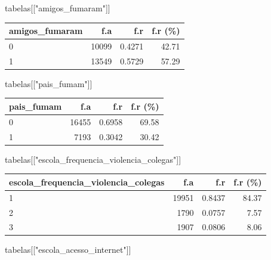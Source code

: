 \documentclass[
]{article}
\newenvironment{Shaded}{\begin{snugshade}}{\end{snugshade}}
\newcommand{\NormalTok}[1]{\textcolor[rgb]{0.00,0.23,0.31}{#1}}
\newcommand{\StringTok}[1]{\textcolor[rgb]{0.13,0.47,0.30}{#1}}
\begin{document}
\begin{Shaded}
\begin{Highlighting}[]
\NormalTok{tabelas[[}\StringTok{"amigos\_fumaram"}\NormalTok{]]}
\end{Highlighting}
\end{Shaded}

\begin{longtable}[]{@{}lrrr@{}}
\toprule()
amigos\_fumaram & f.a & f.r & f.r (\%) \\
\midrule()
\endhead
0 & 10099 & 0.4271 & 42.71 \\
1 & 13549 & 0.5729 & 57.29 \\
\bottomrule()
\end{longtable}

\begin{Shaded}
\begin{Highlighting}[]
\NormalTok{tabelas[[}\StringTok{"pais\_fumam"}\NormalTok{]]}
\end{Highlighting}
\end{Shaded}

\begin{longtable}[]{@{}lrrr@{}}
\toprule()
pais\_fumam & f.a & f.r & f.r (\%) \\
\midrule()
\endhead
0 & 16455 & 0.6958 & 69.58 \\
1 & 7193 & 0.3042 & 30.42 \\
\bottomrule()
\end{longtable}

\begin{Shaded}
\begin{Highlighting}[]
\NormalTok{tabelas[[}\StringTok{"escola\_frequencia\_violencia\_colegas"}\NormalTok{]]}
\end{Highlighting}
\end{Shaded}

\begin{longtable}[]{@{}lrrr@{}}
\toprule()
escola\_frequencia\_violencia\_colegas & f.a & f.r & f.r (\%) \\
\midrule()
\endhead
1 & 19951 & 0.8437 & 84.37 \\
2 & 1790 & 0.0757 & 7.57 \\
3 & 1907 & 0.0806 & 8.06 \\
\bottomrule()
\end{longtable}

\begin{Shaded}
\begin{Highlighting}[]
\NormalTok{tabelas[[}\StringTok{"escola\_acesso\_internet"}\NormalTok{]]}
\end{Highlighting}
\end{Shaded}
\end{document}
